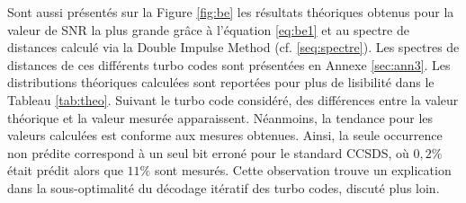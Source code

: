 Sont aussi présentés sur la Figure \ref{fig:be} les résultats théoriques obtenus pour la valeur de SNR la plus grande
grâce à l'équation \ref{eq:be1} et au spectre de distances calculé via la Double Impulse Method (cf. \ref{seq:spectre}). 
Les spectres de distances de ces différents turbo codes sont présentées en Annexe \ref{sec:ann3}. Les distributions théoriques
calculées sont reportées pour plus de lisibilité dans le Tableau \ref{tab:theo}. Suivant le turbo code considéré,
des différences entre la valeur théorique et la valeur mesurée apparaissent. Néanmoins, la tendance pour les valeurs
calculées est conforme
aux mesures obtenues. Ainsi, la seule occurrence non prédite correspond à un seul bit erroné pour le standard CCSDS, où $0,2\%$ 
était prédit alors que $11\%$ sont mesurés. Cette observation trouve un explication dans la sous-optimalité du décodage 
itératif des turbo codes, discuté plus loin.

\begin{table}[]
\centering
\caption{Distribution théorique des erreurs dans le plancher d'erreurs selon l'équation \ref{eq:be1} pour différents turbo 
codes standardisés}
\label{tab:theo}
\end{table}

